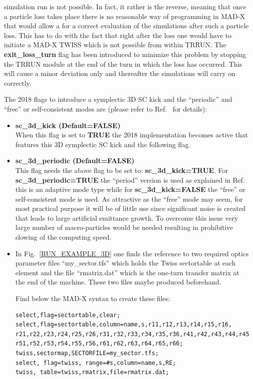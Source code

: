 \begin{itemize}
  simulation run is not possible. In fact, it rather is the reverse,
  meaning that once a particle loss takes place there is no reasonable
  way of programming in MAD-X that would allow a for a correct
  evaluation of the simulations after such a particle loss. This has
  to do with the fact that right after the loss one would have to
  initiate a MAD-X TWISS which is not possible from within TRRUN. The
  {\bf exit\_loss\_turn} flag has been introduced to minimize this
  problem by stopping the TRRUN module at the end of the turn in which
  the loss has occurred. This will cause a minor deviation only and
  thereafter the simulations will carry on correctly.
\end{itemize}

The 2018 flags to introduce a symplectic 3D SC kick and the
``periodic'' and ``free'' or self-consistent modes are (please refer
to Ref.~\cite{YURI2} for details):

\begin{itemize}
\item {\bf sc\_3d\_kick (Default=FALSE)} \\ When this flag is set to
  {\bf TRUE} the 2018 implementation becomes active that features
  this 3D symplectic SC kick and the following flag.
\item {\bf sc\_3d\_periodic (Default=FALSE)} \\ This flag needs the
  above flag to be set to: {\bf sc\_3d\_kick=TRUE}. For {\bf
    sc\_3d\_periodic=TRUE} the ``period'' version is used as
  explained in Ref.~\cite{YURI2} this is an adaptive mode type while
  for {\bf sc\_3d\_kick=FALSE} the ``free'' or self-consistent mode
  is used. As attractive as the ``free'' mode may seem, for most
  practical purpose it will be of little use since significant noise
  is created that leads to large artificial emittance growth. To
  overcome this issue very large number of macro-particles would be
  needed resulting in prohibitive slowing of the computing speed.
\item In Fig.~\ref{RUN_EXAMPLE_3D} one finds the reference to two
  required optics parameter files ``my\_sector.tfs'' which holds the
  Twiss sectortable at each element and the file ``rmatrix.dat'' which
  is the one-turn transfer matrix at the end of the machine. These two
  files maybe produced beforehand.

  Find below the MAD-X syntax to create these files:
\begin{verbatim}
select,flag=sectortable,clear;
select,flag=sectortable,column=name,s,r11,r12,r13,r14,r15,r16,
r21,r22,r23,r24,r25,r26,r31,r32,r33,r34,r35,r36,r41,r42,r43,r44,r45,r46,
r51,r52,r53,r54,r55,r56,r61,r62,r63,r64,r65,r66;
twiss,sectormap,SECTORFILE=my_sector.tfs;
select, flag=twiss, range=#s,column=name,s,RE;
twiss, table=twiss,rmatrix,file=rmatrix.dat;
\end{verbatim}
\end{itemize}

